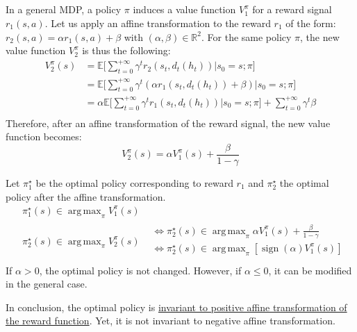 \documentclass[a4paper]{article}
\DeclareMathOperator*{\argmax}{\arg\,\max}
\DeclareMathOperator{\sign}{sign}
\begin{document}
\subsection{}

In a general MDP, a policy $\pi$ induces a value function $V_1^\pi$ for a reward signal $r_1(s,a)$. Let us apply an affine transformation to the reward $r_1$ of the form: $r_2(s,a) = \alpha r_1(s,a) + \beta$ with $(\alpha, \beta) \in \mathbb{R}^2$. For the same policy $\pi$, the new value function $V_2^\pi$ is thus the following:
$$
\begin{aligned}
	V_2^\pi(s)
	&= \mathbb{E}\Big[\sum_{t=0}^{+\infty} \gamma^t r_2(s_t, d_t(h_t)) | s_0=s; \pi \Big] \\
	&= \mathbb{E}\Big[\sum_{t=0}^{+\infty} \gamma^t (\alpha r_1(s_t, d_t(h_t)) + \beta) | s_0=s; \pi \Big] \\
	&= \alpha \mathbb{E}\Big[\sum_{t=0}^{+\infty} \gamma^t r_1(s_t, d_t(h_t)) | s_0=s; \pi \Big] + \sum_{t=0}^{+\infty} \gamma^t \beta \\
\end{aligned}
$$
Therefore, after an affine transformation of the reward signal, the new value function becomes:
$$
	\boxed{V_2^\pi(s) = \alpha V_1^\pi(s) + \frac{\beta}{1 - \gamma}}
$$

Let $\pi_1^\star$ be the optimal policy corresponding to reward $r_1$ and $\pi_2^\star$ the optimal policy after the affine transformation.
$$
\begin{aligned}
&\pi_1^\star(s) \in \argmax_{\pi} V_1^\pi (s) \\
&\pi_2^\star(s) \in \argmax_{\pi} V_2^\pi (s) \begin{aligned}&\iff \pi_2^\star(s) \in \argmax_{\pi} \alpha V_1^\pi(s) + \frac{\beta}{1 - \gamma} \\
&\iff \boxed{\pi_2^\star(s) \in \argmax_{\pi} [ \sign(\alpha) V_1^\pi (s) ]} \\
\end{aligned}
\end{aligned}
$$
If $\alpha > 0$, the optimal policy is not changed. However, if $\alpha \leq 0$, it can be modified in the general case.

In conclusion, the optimal policy is \underline{invariant to positive affine transformation of the reward function}. Yet, it is not invariant to negative affine transformation.


\subsection{}
\end{document}

